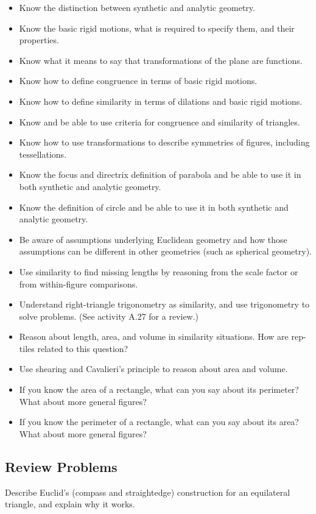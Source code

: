 \begin{itemize}
\item Know the distinction between synthetic and analytic geometry.
\item Know the basic rigid motions, what is required to specify them, and their properties. 
\item Know what it means to say that transformations of the plane are functions.  
\item Know how to define congruence in terms of basic rigid motions. 
\item Know how to define similarity in terms of dilations and basic rigid motions.  
\item Know and be able to use criteria for congruence and similarity of triangles.  
\item Know how to use transformations  to describe symmetries of figures, including tessellations.  
\item Know the focus and directrix definition of parabola and be able to use it in both synthetic and analytic geometry.
\item Know the definition of circle and be able to use it in both synthetic and analytic geometry.
\item Be aware of assumptions underlying Euclidean geometry and how those assumptions can be different in other geometries (such as spherical geometry).  
\item Use similarity to find missing lengths by reasoning from the scale factor or from within-figure comparisons.   
\item Understand right-triangle trigonometry as similarity, and use trigonometry to solve problems.  (See activity A.27 for a review.)
\item Reason about length, area, and volume in similarity situations.  How are rep-tiles related to this question?  
\item Use shearing and Cavalieri's principle to reason about area and volume.  
\item If you know the area of a rectangle, what can you say about its perimeter?  What about more general figures?  
\item If you know the perimeter of a rectangle, what can you say about its area?  What about more general figures? 

\end{itemize}

\subsection*{Review Problems}
\begin{prob}
Describe Euclid's (compass and straightedge) construction for an equilateral triangle, and explain
why it works.
\end{prob}

